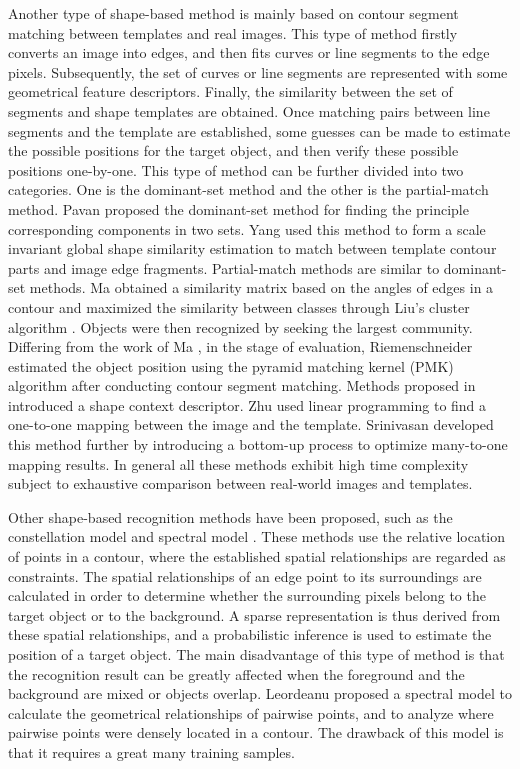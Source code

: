 \documentclass{article}
\begin{document}
Another type of shape-based method is mainly based on contour segment matching between templates and real images. 
This type of method firstly converts an image into edges, 
and then fits curves or line segments to the edge pixels. 
Subsequently, the set of curves or line segments are represented with some geometrical feature descriptors. Finally, the similarity between the set of segments and shape templates are obtained. 
Once matching pairs between line segments and the template are established, 
some guesses can be made to estimate the possible positions for the target object, 
and then verify these possible positions one-by-one. 
This type of method can be further divided into two categories. 
One is the dominant-set method and the other is the partial-match method. 
Pavan \cite{pavan2007} proposed the dominant-set method for finding the principle corresponding components in two sets. 
Yang \cite{yang2012} used this method to form a scale invariant global shape similarity estimation to match between template contour parts and image edge fragments. 
Partial-match methods \cite{ma2011,riemenschneider2010,liu2010} are similar to dominant-set methods. 
Ma \cite{ma2011} obtained a similarity matrix based on the angles of edges in a contour and maximized the similarity between classes through Liu's cluster algorithm \cite{liu2010}. 
Objects were then recognized by seeking the largest community. 
Differing from the work of Ma \cite{ma2011}, 
in the stage of evaluation, Riemenschneider \cite{riemenschneider2010} estimated the object position using the pyramid matching kernel (PMK) algorithm after conducting contour segment matching. 
Methods proposed in \cite{zhu2008,srinivasan2010} introduced a shape context descriptor. 
Zhu \cite{zhu2008} used linear programming to find a one-to-one mapping between the image and the template. 
Srinivasan \cite{srinivasan2010} developed this method further by introducing a bottom-up process to optimize many-to-one mapping results. 
In general all these methods exhibit high time complexity subject to exhaustive comparison between real-world images and templates.

Other shape-based recognition methods have been proposed, 
such as the constellation model \cite{fergus2004} and spectral model \cite{leordeanu2007}.
These methods use the relative location of points in a contour, 
where the established spatial relationships are regarded as constraints. 
The spatial relationships of an edge point to its surroundings are calculated in order to 
determine whether the surrounding pixels belong to the target object or to the background. 
A sparse representation is thus derived from these spatial relationships, 
and a probabilistic inference is used to estimate the position of a target object. 
The main disadvantage of this type of method is that the recognition result can be greatly affected 
when the foreground and the background are mixed or objects overlap. 
Leordeanu \cite{leordeanu2007} proposed a spectral model to calculate the geometrical relationships of pairwise points, 
and to analyze where pairwise points were densely located in a contour. 
The drawback of this model is that it requires a great many training samples.
\end{document}
